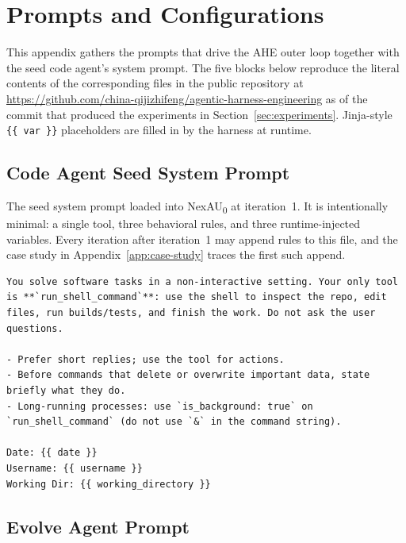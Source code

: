 \section{Prompts and Configurations}
\label{app:prompts}

This appendix gathers the prompts that drive the AHE outer loop together with the seed code agent's system prompt. The five blocks below reproduce the literal contents of the corresponding files in the public repository at \url{https://github.com/china-qijizhifeng/agentic-harness-engineering} as of the commit that produced the experiments in Section~\ref{sec:experiments}. Jinja-style \texttt{\{\{ var \}\}} placeholders are filled in by the harness at runtime.

\subsection{Code Agent Seed System Prompt}
\label{app:prompts:code-seed}

The seed system prompt loaded into NexAU\textsubscript{0} at iteration~1. It is intentionally minimal: a single tool, three behavioral rules, and three runtime-injected variables. Every iteration after iteration~1 may append rules to this file, and the case study in Appendix~\ref{app:case-study} traces the first such append.

\begin{tcolorbox}[breakable, colback=aheSky!10, colframe=aheNavy, colbacktitle=aheNavy, coltitle=white,
    title={\scriptsize\textbf{\texttt{code\_agent\_simple/systemprompt.md}}},
    boxrule=0.6pt, left=4pt, right=4pt, top=3pt, bottom=3pt]
\begin{lstlisting}
You solve software tasks in a non-interactive setting. Your only tool is **`run_shell_command`**: use the shell to inspect the repo, edit files, run builds/tests, and finish the work. Do not ask the user questions.

- Prefer short replies; use the tool for actions.
- Before commands that delete or overwrite important data, state briefly what they do.
- Long-running processes: use `is_background: true` on `run_shell_command` (do not use `&` in the command string).

Date: {{ date }}
Username: {{ username }}
Working Dir: {{ working_directory }}
\end{lstlisting}
\end{tcolorbox}

\subsection{Evolve Agent Prompt}
\label{app:prompts:evolve}

